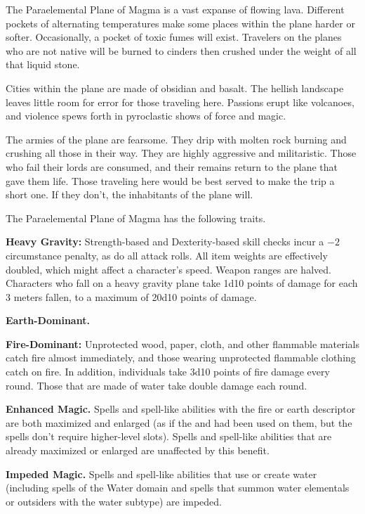 The Paraelemental Plane of Magma is a vast expanse of flowing lava. Different pockets of alternating temperatures make some places within the plane harder or softer. Occasionally, a pocket of toxic fumes will exist. Travelers on the planes who are not native will be burned to cinders then crushed under the weight of all that liquid stone.

Cities within the plane are made of obsidian and basalt. The hellish landscape leaves little room for error for those traveling here. Passions erupt like volcanoes, and violence spews forth in pyroclastic shows of force and magic.
 
The armies of the plane are fearsome. They drip with molten rock burning and crushing all those in their way. They are highly aggressive and militaristic. Those who fail their lords are consumed, and their remains return to the plane that gave them life. Those traveling here would be best served to make the trip a short one. If they don't, the inhabitants of the plane will.

The Paraelemental Plane of Magma has the following traits.
\begin{itemize*}
\item \textbf{Heavy Gravity:} Strength-based and Dexterity-based skill checks incur a $-2$ circumstance penalty, as do all attack rolls. All item weights are effectively doubled, which might affect a character's speed. Weapon ranges are halved. Characters who fall on a heavy gravity plane take 1d10 points of damage for each 3 meters fallen, to a maximum of 20d10 points of damage.
\item \textbf{Earth-Dominant.}
\item \textbf{Fire-Dominant:} Unprotected wood, paper, cloth, and other flammable materials catch fire almost immediately, and those wearing unprotected flammable clothing catch on fire. In addition, individuals take 3d10 points of fire damage every round. Those that are made of water take double damage each round.
\item \textbf{Enhanced Magic.} Spells and spell-like abilities with the fire or earth descriptor are both maximized and enlarged (as if the  and  had been used on them, but the spells don't require higher-level slots). Spells and spell-like abilities that are already maximized or enlarged are unaffected by this benefit.
\item \textbf{Impeded Magic.} Spells and spell-like abilities that use or create water (including spells of the Water domain and spells that summon water elementals or outsiders with the water subtype) are impeded.
\end{itemize*}
